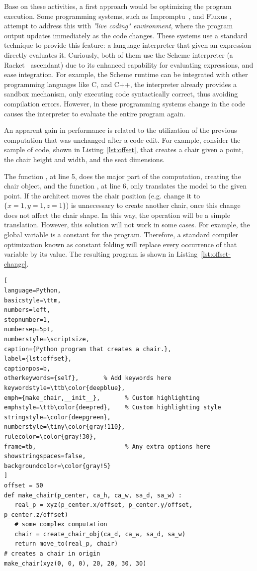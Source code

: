 Base on these activities, a first approach would be optimizing the program execution. Some programming systems, such as Impromptu~\citep{sorensen2005impromptu}, and Fluxus \citep{griffiths2007fluxus}, attempt to address this with \textit{"live coding" environment}, where the program output updates immediately as the code changes. These systems use a standard technique to provide this feature: a language interpreter that given an expression directly evaluates it. Curiously, both of them use the Scheme interpreter (a Racket~\citep{findler2002drscheme} ascendant) due to its enhanced capability for evaluating expressions, and ease integration. For example, the Scheme runtime can be integrated with other programming languages like C, and C++, the interpreter already provides a sandbox mechanism, only executing code syntactically correct, thus avoiding compilation errors. However, in these programming systems change in the code causes the interpreter to evaluate the entire program again.

An apparent gain in performance is related to the utilization of the previous computation that was unchanged after a code edit. For example, consider the sample of code, shown in Listing~\ref{lst:offset}, that creates a chair given a point, the chair height and width, and the seat dimensions.

The function , at line 5, does the major part of the computation, creating the chair object, and the function , at line 6, only translates the model to the given point. If the architect moves the chair position (e.g. change it to $\{ x\!=\!1,y\!=\!1,z\!=\!1 \}$) is unnecessary to create another chair, once this change does not affect the chair shape. In this way, the operation will be a simple translation. However, this solution will not work in some cases. For example, the global variable  is a constant for the program. Therefore, a standard compiler optimization known as constant folding will replace every occurrence of that variable by its value. The resulting program is shown in Listing~\ref{lst:offset-change}.


\begin{lstlisting}[
language=Python,
basicstyle=\ttm,
numbers=left,
stepnumber=1,
numbersep=5pt,                   
numberstyle=\scriptsize, 
caption={Python program that creates a chair.},
label={lst:offset},
captionpos=b, 
otherkeywords={self},       % Add keywords here
keywordstyle=\ttb\color{deepblue},
emph={make_chair,__init__},       % Custom highlighting
emphstyle=\ttb\color{deepred},    % Custom highlighting style
stringstyle=\color{deepgreen},
numberstyle=\tiny\color{gray!110},
rulecolor=\color{gray!30},
frame=tb,                         % Any extra options here
showstringspaces=false,
backgroundcolor=\color{gray!5} 
]
offset = 50
def make_chair(p_center, ca_h, ca_w, sa_d, sa_w) :
   real_p = xyz(p_center.x/offset, p_center.y/offset, p_center.z/offset)
   # some complex computation
   chair = create_chair_obj(ca_d, ca_w, sa_d, sa_w)
   return move_to(real_p, chair)
# creates a chair in origin
make_chair(xyz(0, 0, 0), 20, 20, 30, 30)
\end{lstlisting}

